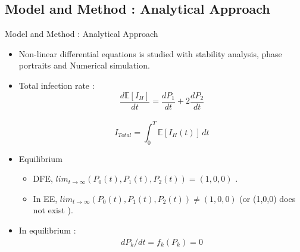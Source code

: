 \documentclass[smaller,aspectratio=169, toc=bibliography]{beamer}
\begin{document}
\subsection*{Model and Method : Analytical Approach }
\begin{frame}[fragile]{Model and Method : Analytical Approach }
\begin{itemize}
\item Non-linear differential equations is studied with stability analysis, phase portraits and Numerical simulation.  
\item Total infection rate :
$$ \frac{d\mathbb{E}[I_H]}{dt} = \frac{dP_1}{dt} + 2\frac{dP_2}{dt} $$\\  
\begin{equation*}
\label{Total Infection rate}
   I_{Total} =  \int_{0}^{T} \mathbb{E}[I_H(t)] \,dt  
\end{equation*}

\item Equilibrium 

\begin{itemize}
	\item DFE, $\displaystyle lim_{t\rightarrow\infty}(P_0(t),P_1(t),P_2(t)) = (1, 0, 0)$ . 
	\item In EE, $\displaystyle lim_{t\rightarrow\infty} (P_0(t),P_1(t),P_2(t)) \neq (1,0,0)$ (or (1,0,0) does not exist ).
\end{itemize}


\item In equilibrium :   
\begin{equation*}
\label{function_pk}
	\begin{aligned}
	   	dP_k/dt = f_k(P_k) = 0   
	\end{aligned}	 
\end{equation*}

\end{itemize}
\end{frame}
\end{document}
